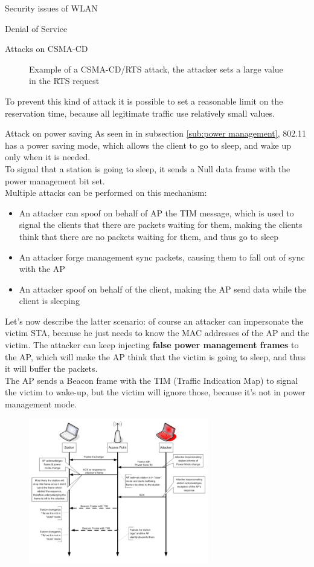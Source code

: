 \begin{section}{Security issues of WLAN}
\begin{subsection}{Denial of Service}
\begin{subsubsection}{Attacks on CSMA-CD}
\begin{figure}[h]
        \caption{Example of a CSMA-CD/RTS attack, the attacker sets a large value in the RTS request}
      \end{figure}
      To prevent this kind of attack it is possible to set a reasonable limit on the reservation time,
      because all legitimate traffic use relatively small values. 
    \end{subsubsection}
    \begin{subsubsection}{Attack on power saving}
      As seen in in subsection \ref{sub:power management}, 802.11 has a power saving mode, which allows
      the client to go to sleep, and wake up only when it is needed.\\
      To signal that a station is going to sleep, it sends a Null data frame with the power management
      bit set.\\
      Multiple attacks can be performed on this mechanism:
      \begin{itemize}
        \item An attacker can spoof on behalf of AP the TIM message, which is used to signal the clients
          that there are packets waiting for them, making the clients think that there are no packets
          waiting for them, and thus go to sleep
        \item An attacker forge management sync packets, causing them to fall out of sync with the AP
        \item An attacker spoof on behalf of the client, making the AP send data while the client is 
          sleeping
      \end{itemize}
      Let's now describe the latter scenario: of course an attacker can impersonate the victim STA,
      because he just needs to know the MAC addresses of the AP and the victim. The attacker can 
      keep injecting \textbf{false power management frames} to the AP, which will make the AP think
      that the victim is going to sleep, and thus it will buffer the packets.\\
      The AP sends a Beacon frame with the TIM (Traffic Indication Map) to signal the victim to 
      wake-up, but the victim will ignore those, because it's not in power management mode.\\
      \begin{figure}[h]
        \centering
        \includegraphics[width=0.7\textwidth]{img/wireless/power saving attack.png}

\end{figure}
\end{subsubsection}
\end{subsection}
\end{section}
